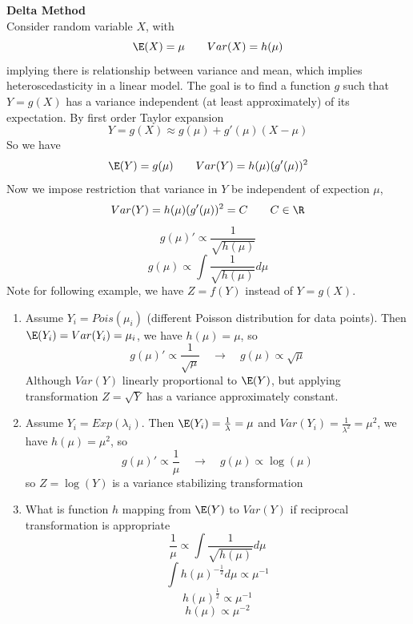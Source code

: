 \documentclass[11pt]{article}
\begin{document}
\begin{defn*}
    \textbf{Delta Method} \\
    
    Consider random variable $X$, with 
    \[
        \E(X) = \mu \quad\quad Var(X) = h(\mu)   
    \]
    implying there is relationship between variance and mean, which implies heteroscedasticity in a linear model. The goal is to find a function $g$ such that $Y=g(X)$ has a variance independent (at least approximately) of its expectation. By first order Taylor expansion
    \[
        Y = g(X) \approx g(\mu) + g'(\mu) (X - \mu)
    \]
    So we have 
    \[
        \E(Y) = g(\mu) \quad \quad Var(Y) = h(\mu) (g'(\mu))^2
    \]
    Now we impose restriction that variance in $Y$ be independent of expection $\mu$, 
    \[
        Var(Y) = h(\mu) (g'(\mu))^2 = C \quad \quad C\in \R 
    \]
    \[
        g(\mu)' \propto \frac{1}{\sqrt{h(\mu)}} 
    \]
    \[
        g(\mu) \propto \int \frac{1}{\sqrt{h(\mu)}} d\mu
    \]
    Note for following example, we have $Z = f(Y)$ instead of $Y = g(X)$.\\
    \begin{enumerate}
        \item Assume $Y_i = Pois(\mu_i)$ (different Poisson distribution for data points). Then $\E(Y_i) = Var(Y_i) = \mu_i$, we have $h(\mu) = \mu$, so 
        \[
            g(\mu)' \propto \frac{1}{\sqrt{\mu}} \quad\to\quad g(\mu) \propto \sqrt{\mu}
        \]
        Although $Var(Y)$ linearly proportional to $\E(Y)$, but applying transformation $Z = \sqrt{Y}$ has a variance approximately constant.
        \item Assume $Y_i = Exp(\lambda_i)$. Then $\E(Y_i) = \frac{1}{\lambda} = \mu$ and $Var(Y_i) = \frac{1}{\lambda^2} = \mu^2$, we have $h(\mu) = \mu^2$,  so
        \[
            g(\mu)' \propto \frac{1}{\mu} \quad \to\quad g(\mu) \propto \log(\mu)
        \]
        so $Z = \log(Y)$ is a variance stabilizing transformation
        \item What is function $h$ mapping from $\E(Y)$ to $Var(Y)$ if reciprocal transformation is appropriate 
        \[
            \frac{1}{\mu} \propto \int \frac{1}{\sqrt{h(\mu)}} d\mu 
        \]
        \[
            \int h(\mu)^{-\frac{1}{2}} d\mu \propto \mu^{-1}
        \]
        \[
             h(\mu)^{\frac{1}{2}} \propto \mu^{-1}
        \]
        \[
            h(\mu) \propto \mu^{-2}
        \]
    \end{enumerate}
\end{defn*}
\end{document}
